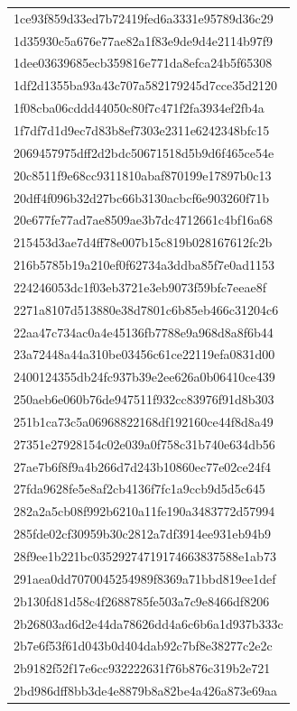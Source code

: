 \begin{tabular}{l}
1ce93f859d33ed7b72419fed6a3331e95789d36c29 \\
1d35930c5a676e77ae82a1f83e9de9d4e2114b97f9 \\
1dee03639685ecb359816e771da8efca24b5f65308 \\
1df2d1355ba93a43c707a582179245d7cce35d2120 \\
1f08cba06cddd44050c80f7c471f2fa3934ef2fb4a \\
1f7df7d1d9ec7d83b8ef7303e2311e6242348bfc15 \\
2069457975dff2d2bdc50671518d5b9d6f465ce54e \\
20c8511f9e68cc9311810abaf870199e17897b0c13 \\
20dff4f096b32d27bc66b3130acbcf6e903260f71b \\
20e677fe77ad7ae8509ae3b7dc4712661c4bf16a68 \\
215453d3ae7d4ff78e007b15c819b028167612fc2b \\
216b5785b19a210ef0f62734a3ddba85f7e0ad1153 \\
224246053dc1f03eb3721e3eb9073f59bfc7eeae8f \\
2271a8107d513880e38d7801c6b85eb466c31204c6 \\
22aa47c734ac0a4e45136fb7788e9a968d8a8f6b44 \\
23a72448a44a310be03456c61ce22119efa0831d00 \\
2400124355db24fc937b39e2ee626a0b06410ce439 \\
250aeb6e060b76de947511f932cc83976f91d8b303 \\
251b1ca73c5a06968822168df192160ce44f8d8a49 \\
27351e27928154c02e039a0f758c31b740e634db56 \\
27ae7b6f8f9a4b266d7d243b10860ec77e02ce24f4 \\
27fda9628fe5e8af2cb4136f7fc1a9ccb9d5d5c645 \\
282a2a5cb08f992b6210a11fe190a3483772d57994 \\
285fde02cf30959b30c2812a7df3914ee931eb94b9 \\
28f9ee1b221bc03529274719174663837588e1ab73 \\
291aea0dd7070045254989f8369a71bbd819ee1def \\
2b130fd81d58c4f2688785fe503a7c9e8466df8206 \\
2b26803ad6d2e44da78626dd4a6c6b6a1d937b333c \\
2b7e6f53f61d043b0d404dab92c7bf8e38277c2e2c \\
2b9182f52f17e6cc932222631f76b876c319b2e721 \\
2bd986dff8bb3de4e8879b8a82be4a426a873e69aa \\

\end{tabular}
